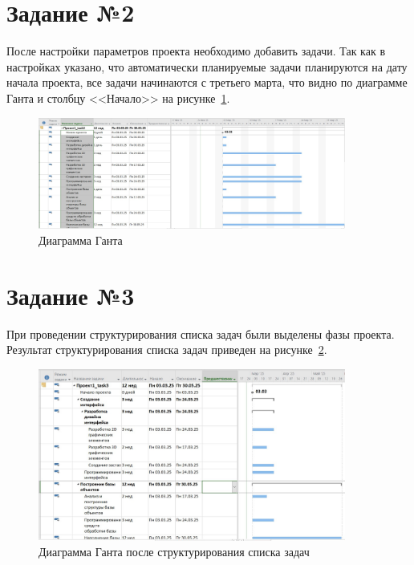 \section{Задание №2}

После настройки параметров проекта необходимо добавить задачи.
Так как в настройках указано, что автоматически планируемые задачи планируются на дату начала проекта, все задачи начинаются с третьего марта, что видно по диаграмме Ганта и столбцу <<Начало>> на рисунке~\ref{fig:task2}.

\begin{figure}[H]
	\centering
	\includegraphics[width=0.9\textwidth]{img/task2/tasks.jpg}
	\caption{Диаграмма Ганта}
	\label{fig:task2}
\end{figure}

\section{Задание №3}

При проведении структурирования списка задач были выделены фазы проекта.
Результат структурирования списка задач приведен на рисунке~\ref{fig:task3}.

\begin{figure}[H]
	\centering
	\includegraphics[width=0.9\textwidth]{img/task3/task3.jpg}
	\caption{Диаграмма Ганта после структурирования списка задач}
	\label{fig:task3}
\end{figure}

